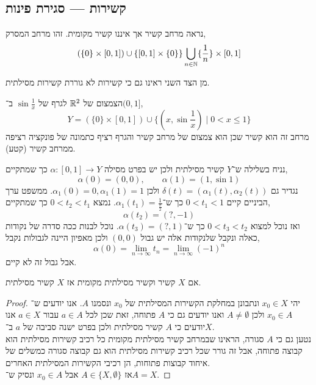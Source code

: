 \subsection{קשירות --- סגירת פינות}
\begin{example}
	נראה מרחב קשיר אך איננו קשיר מקומית.
	זהו מרחב המסרק,
	\[
		( \{0\} \times [0, 1]) \cup \{ [0, 1] \times \{ 0 \} \} \bigcup_{n \in \mathbb{N}} \{ \frac{1}{n} \} \times [0, 1]
	\]
\end{example}
מן הצד השני ראינו גם כי קשירות לא גוררת קשירות מסילתית.
\begin{example}
	הצמצום של $\mathbb{R}^2$ לגרף של $\sin \frac{1}{x}$ ב־$(0, 1]$,
	\[
		Y = (\{ 0 \} \times [0, 1]) \cup \{ (x, \sin \frac{1}{x}) \mid 0 < x \le 1 \}
	\]
	מרחב זה הוא קשיר שכן הוא צמצום של מרחב קשיר והגרף רציף כתמונה של פונקציה רציפה ממרחב קשיר (קטע).

	נניח בשלילה ש־$Y$ קשיר מסילתית ולכן יש בפרט מסילה $\alpha : [0, 1] \to Y$ כך שמתקיים,
	\[
		\alpha(0) = (0, 0),
		\qquad \alpha(1) = (1, \sin 1)
	\]
	נגדיר גם $\delta(t) = (\alpha_{1}(t), \alpha_{2}(t))$ ולכן $\alpha_{1}(0) = 0, \alpha_{1}(1) = 1$.
	ממשפט ערך הביניים קיים $0 < t_1 < 1$ כך ש־$\alpha_{1}(t_1) = \frac{1}{\frac{\pi}{2}}$.
	נמצא $0 < t_2 < t_1$ כך שמתקיים,
	\[
		\alpha(t_2) = (?, -1)
	\]
	ואז נוכל למצוא $0 < t_3 < t_2$ כך ש־$\alpha(t_3) = (?, 1)$.
	נוכל לבנות ככה סדרה של נקודות כאלה ונקבל שלנקודות אלה יש גבול $(0, 0)$ ולכן מאפיון היינה לגבולות נקבל,
	\[
		\alpha(0)
		= \lim_{n \to \infty} t_n
		= \lim_{n \to \infty} {(-1)}^n
	\]
	אבל גבול זה לא קיים.
\end{example}
\begin{proposition}
	אם $X$ קשיר וקשיר מסילתית מקומית אז $X$ קשיר מסילתית.
\end{proposition}
\begin{proof}
	יהי $x_0 \in X$ ונתבונן במחלקת הקשירות המסילתית של $x_0$ ונסמנו $A$.
	אנו יודעים ש־$x_0 \in A$ ולכן $A \ne \emptyset$ ואנו יודעים גם כי $A$ פתוחה,
	זאת שכן לכל $a \in A$ עבור $a \in X$ אנו יודעים כי $A$ קשיר מסילתית ולכן בפרט ישנה סביבה של $a$ ב־$X$. \\
	נטען גם כי $A$ סגורה,
	הראינו שבמרחב קשיר מסילתית מקומית כל רכיב קשירות מסילתית הוא קבוצה פתוחה, אבל זה גורר שכל רכיב קשירות מסילתית הוא גם קבוצה סגורה כמשלים של איחוד קבוצות פתוחות, הן רכיבי הקשירות המסילתית האחרים. \\
	אז $A \in \{X, \emptyset\}$ אבל $x_0 \in A$ ונסיק ש־$A = X$.
\end{proof}

